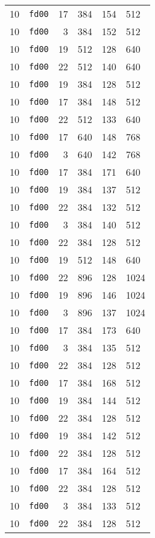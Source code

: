 \documentclass{article}
\begin{document}
\begin{table}[h!]
\begin{tabular}{llrrrl}
    10 & \texttt{fd00} & 17 & 384 & 154 & 512 \\
    10 & \texttt{fd00} & 3 & 384 & 152 & 512 \\
    10 & \texttt{fd00} & 19 & 512 & 128 & 640 \\
    10 & \texttt{fd00} & 22 & 512 & 140 & 640 \\
    10 & \texttt{fd00} & 19 & 384 & 128 & 512 \\
    10 & \texttt{fd00} & 17 & 384 & 148 & 512 \\
    10 & \texttt{fd00} & 22 & 512 & 133 & 640 \\
    10 & \texttt{fd00} & 17 & 640 & 148 & 768 \\
    10 & \texttt{fd00} & 3 & 640 & 142 & 768 \\
    10 & \texttt{fd00} & 17 & 384 & 171 & 640 \\
    10 & \texttt{fd00} & 19 & 384 & 137 & 512 \\
    10 & \texttt{fd00} & 22 & 384 & 132 & 512 \\
    10 & \texttt{fd00} & 3 & 384 & 140 & 512 \\
    10 & \texttt{fd00} & 22 & 384 & 128 & 512 \\
    10 & \texttt{fd00} & 19 & 512 & 148 & 640 \\
    10 & \texttt{fd00} & 22 & 896 & 128 & 1024 \\
    10 & \texttt{fd00} & 19 & 896 & 146 & 1024 \\
    10 & \texttt{fd00} & 3 & 896 & 137 & 1024 \\
    10 & \texttt{fd00} & 17 & 384 & 173 & 640 \\
    10 & \texttt{fd00} & 3 & 384 & 135 & 512 \\
    10 & \texttt{fd00} & 22 & 384 & 128 & 512 \\
    10 & \texttt{fd00} & 17 & 384 & 168 & 512 \\
    10 & \texttt{fd00} & 19 & 384 & 144 & 512 \\
    10 & \texttt{fd00} & 22 & 384 & 128 & 512 \\
    10 & \texttt{fd00} & 19 & 384 & 142 & 512 \\
    10 & \texttt{fd00} & 22 & 384 & 128 & 512 \\
    10 & \texttt{fd00} & 17 & 384 & 164 & 512 \\
    10 & \texttt{fd00} & 22 & 384 & 128 & 512 \\
    10 & \texttt{fd00} & 3 & 384 & 133 & 512 \\
    10 & \texttt{fd00} & 22 & 384 & 128 & 512 \\

\end{tabular}
\end{table}
\end{document}
